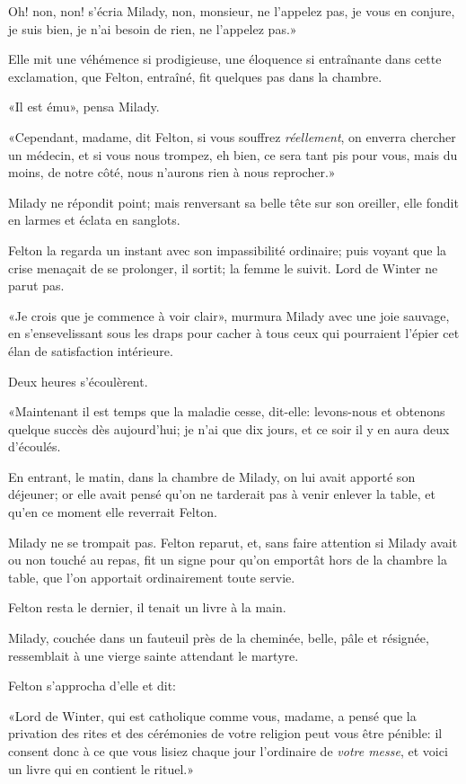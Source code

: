 \speak  Oh! non, non! s'écria Milady, non, monsieur, ne l'appelez pas, je vous en conjure, je suis bien, je n'ai besoin de rien, ne l'appelez pas.» 

Elle mit une véhémence si prodigieuse, une éloquence si entraînante dans cette exclamation, que Felton, entraîné, fit quelques pas dans la chambre. 

«Il est ému», pensa Milady. 

«Cependant, madame, dit Felton, si vous souffrez \textit{réellement}, on enverra chercher un médecin, et si vous nous trompez, eh bien, ce sera tant pis pour vous, mais du moins, de notre côté, nous n'aurons rien à nous reprocher.» 

Milady ne répondit point; mais renversant sa belle tête sur son oreiller, elle fondit en larmes et éclata en sanglots. 

Felton la regarda un instant avec son impassibilité ordinaire; puis voyant que la crise menaçait de se prolonger, il sortit; la femme le suivit. Lord de Winter ne parut pas. 

«Je crois que je commence à voir clair», murmura Milady avec une joie sauvage, en s'ensevelissant sous les draps pour cacher à tous ceux qui pourraient l'épier cet élan de satisfaction intérieure. 

Deux heures s'écoulèrent. 

«Maintenant il est temps que la maladie cesse, dit-elle: levons-nous et obtenons quelque succès dès aujourd'hui; je n'ai que dix jours, et ce soir il y en aura deux d'écoulés. 

En entrant, le matin, dans la chambre de Milady, on lui avait apporté son déjeuner; or elle avait pensé qu'on ne tarderait pas à venir enlever la table, et qu'en ce moment elle reverrait Felton. 

Milady ne se trompait pas. Felton reparut, et, sans faire attention si Milady avait ou non touché au repas, fit un signe pour qu'on emportât hors de la chambre la table, que l'on apportait ordinairement toute servie. 

Felton resta le dernier, il tenait un livre à la main. 

Milady, couchée dans un fauteuil près de la cheminée, belle, pâle et résignée, ressemblait à une vierge sainte attendant le martyre. 

Felton s'approcha d'elle et dit: 

«Lord de Winter, qui est catholique comme vous, madame, a pensé que la privation des rites et des cérémonies de votre religion peut vous être pénible: il consent donc à ce que vous lisiez chaque jour l'ordinaire de \textit{votre messe}, et voici un livre qui en contient le rituel.» 

